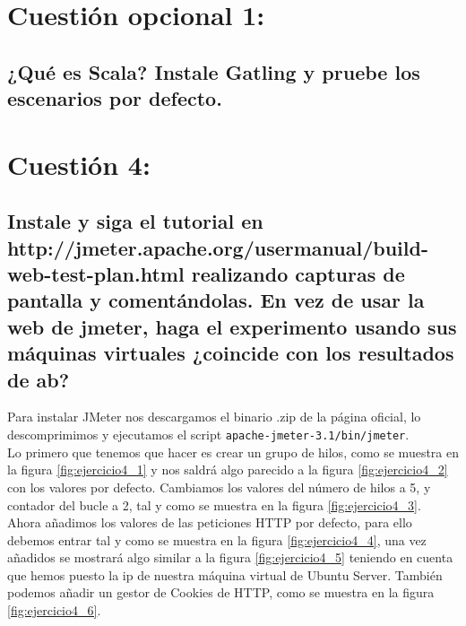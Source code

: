 
\section{Cuestión opcional 1:}

\subsection{¿Qué es Scala? Instale Gatling y pruebe los escenarios por defecto.}





\section{Cuestión 4:}

\subsection{Instale y siga el tutorial en http://jmeter.apache.org/usermanual/build-web-test-plan.html \cite{ejer4} realizando capturas de pantalla y comentándolas. En vez de usar la web de jmeter, haga el experimento usando sus máquinas virtuales ¿coincide con los resultados de ab?}

Para instalar JMeter nos descargamos el binario .zip de la página oficial, lo descomprimimos y ejecutamos el script \texttt{apache-jmeter-3.1/bin/jmeter}.\\

Lo primero que tenemos que hacer es crear un grupo de hilos, como se muestra en la figura \ref{fig:ejercicio4_1} y nos saldrá algo parecido a la figura \ref{fig:ejercicio4_2} con los valores por defecto. Cambiamos los valores del número de hilos a 5, y contador del bucle a 2, tal y como se muestra en la figura \ref{fig:ejercicio4_3}.\\

Ahora añadimos los valores de las peticiones HTTP por defecto, para ello debemos entrar tal y como se muestra en la figura \ref{fig:ejercicio4_4}, una vez añadidos se mostrará algo similar a la figura \ref{fig:ejercicio4_5} teniendo en cuenta que hemos puesto la ip de nuestra máquina virtual de Ubuntu Server. También podemos añadir un gestor de Cookies de HTTP, como se muestra en la figura \ref{fig:ejercicio4_6}.\\

